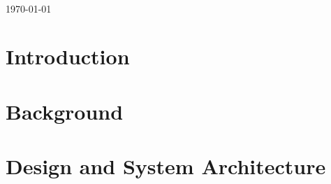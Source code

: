 \documentclass[12pt]{article}
\begin{document}
\begin{titlepage}
\begin{minipage}{0.4\textwidth}
\begin{flushright}
\end{flushright}
\end{minipage}\\
\vfill
\vspace{5pt}
\vspace{20pt}
{\large \today}\\[12cm]
\vfill
\end{titlepage}		
\pagebreak


\pagebreak

\tableofcontents
\pagebreak

\section{Introduction}\label{section1}


\section{Background}\label{section2}


\section{Design and System Architecture}\label{section3}

\end{document}
